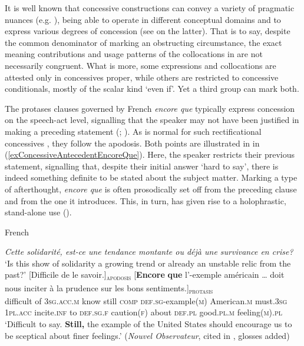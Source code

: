 It is well known that concessive constructions can convey a variety of pragmatic nuances (e.g. \cite{KoenigConcessives}), being able to operate in different conceptual domains and to express various degrees of concession (see \cite{Bell2010} on the latter). That is to say, despite the common denominator of marking an obstructing circumstance, the exact meaning contributions and usage patterns of the collocations in  are not necessarily congruent. What is more, some expressions and collocations are attested only in concessives proper, while others are restricted to concessive conditionals, mostly of the scalar kind \lq even if\rq{}. Yet a third group can mark both.

The protases clauses governed by French \textit{encore que} typically express concession on the speech-act level, signalling that the speaker may not have been justified in making a preceding statement (\cite[194–195]{MosegaardHansen2008}; \cite[10–12]{Morel1996}). As is normal for such rectificational concessives \parencite{KoenigConcessives}, they follow the apodosis. Both points are illustrated in in (\ref{exConcessiveAntecedentEncoreQue}). Here, the speaker restricts their previous statement, signalling that, despite their initial answer \lq hard to say\rq{}, there is indeed something definite to be stated about the subject matter. Marking a type of afterthought, \textit{encore que} is often prosodically set off from the preceding clause and from the one it introduces. This, in turn, has given rise to a holophrastic, stand-alone use (). 

\begin{exe}
\ex French\label{exConcessiveAntecedentEncoreQue}
	\begin{xlist}
		\textit{Cette solidarité, est-ce une tendance montante ou déjà une survivance en crise?}\\
		\lq Is this show of solidarity a growing trend or already an unstable relic from the past?\rq
		\gll \textup{[}Difficile de le savoir.\textup{]\textsubscript{\textsc{apodosis}}} \textup{[}\textbf{Encore} \textbf{que} l’-exemple américain … doit nous inciter à la prudence sur les bons sentiments.\textup{]\textsubscript{\textsc{protasis}}}\\
		\phantom{[}difficult of 3\textsc{sg}.\textsc{acc}.\textsc{m} know \phantom{[}still \textsc{comp} \textsc{def}.\textsc{sg}-example(\textsc{m}) American.\textsc{m} {} must.3\textsc{sg} 1\textsc{pl}.\textsc{acc} incite.\textsc{inf} to \textsc{def}.\textsc{sg}.\textsc{f} caution(\textsc{f}) about \textsc{def}.\textsc{pl} good.\textsc{pl}.\textsc{m} feeling(\textsc{m}).\textsc{pl}\\
		\glt \lq Difficult to say. \textbf{Still,} the example of the United States should encourage us to be sceptical about finer feelings.’ (\textit{Nouvel Observateur}, cited in \cite[192]{MosegaardHansen2008}, glosses added)
	\end{xlist}
\end{exe} 

